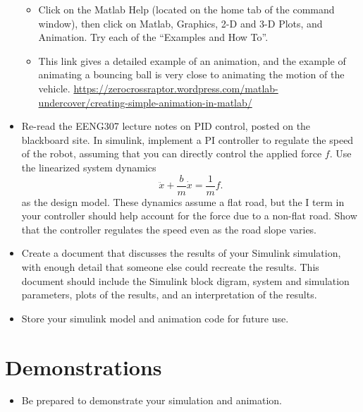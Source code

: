 \begin{itemize}
\begin{itemize}
\item Click on the Matlab Help (located on the home tab of the command window), then click on \textsf{Matlab}, \textsf{Graphics}, \textsf{2-D and 3-D Plots}, and \textsf{Animation}. Try each of the ``Examples and How To''.
\item This link gives a detailed example of an animation, and the example of animating a bouncing ball is very close to animating the motion of the vehicle. \url{https://zerocrossraptor.wordpress.com/matlab-undercover/creating-simple-animation-in-matlab/}
\end{itemize}
\item Re-read the EENG307 lecture notes on PID control, posted on the blackboard site. In simulink, implement a PI controller to regulate the speed of the robot, assuming that you can directly control the applied force $f$. Use the linearized system dynamics 
\[
\ddot{x} + \frac{b}{m}\dot{x} = \frac{1}{m}f.
\]
as the design model. These dynamics assume a flat road, but the I term in your controller should help account for the force due to a non-flat road. Show that the controller regulates the speed even as the road slope varies.
\item Create a document that discusses the results of your Simulink simulation, with enough detail that someone else could recreate the results. This document should include the Simulink block digram, system and simulation parameters, plots of the results, and an interpretation of the results.
\item Store your simulink model and animation code for future use.
\end{itemize}

\section{Demonstrations}
\begin{itemize}
\item Be prepared to demonstrate your simulation and animation.
\end{itemize}


